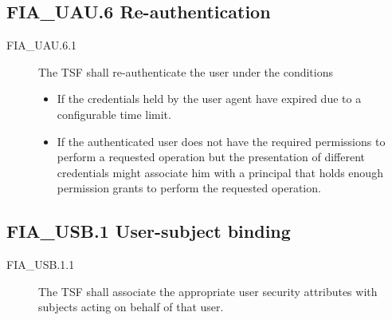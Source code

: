 \documentclass[10pt,a4paper,english]{scrbook}
\begin{document}

\hypertarget{fia-uau-6-re-authentication}{}
\subsection{FIA{\_}UAU.6 Re-authentication}
\begin{description}
\item[FIA{\_}UAU.6.1 ]

The TSF shall re-authenticate the user under the conditions
\begin{itemize}
\item {} 
If the credentials held by the user agent have expired due to
a configurable time limit.

\item {} 
If the authenticated user does not have the required permissions to
perform a requested operation but the presentation of different
credentials might associate him with a principal that holds enough
permission grants to perform the requested operation.

\end{itemize}

\end{description}



\hypertarget{fia-usb-1-user-subject-binding}{}
\subsection{FIA{\_}USB.1 User-subject binding}
\begin{description}
\item[FIA{\_}USB.1.1]

The TSF shall associate the appropriate user security
attributes with subjects acting on behalf of that user.

\end{description}


\end{document}
